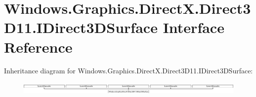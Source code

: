 \hypertarget{interface_windows_1_1_graphics_1_1_direct_x_1_1_direct3_d11_1_1_i_direct3_d_surface}{}\section{Windows.\+Graphics.\+Direct\+X.\+Direct3\+D11.\+I\+Direct3\+D\+Surface Interface Reference}
\label{interface_windows_1_1_graphics_1_1_direct_x_1_1_direct3_d11_1_1_i_direct3_d_surface}
Inheritance diagram for Windows.\+Graphics.\+Direct\+X.\+Direct3\+D11.\+I\+Direct3\+D\+Surface\+:\begin{figure}[H]
\begin{center}
\leavevmode
\includegraphics[height=0.654971cm]{interface_windows_1_1_graphics_1_1_direct_x_1_1_direct3_d11_1_1_i_direct3_d_surface}
\end{center}
\end{figure}
